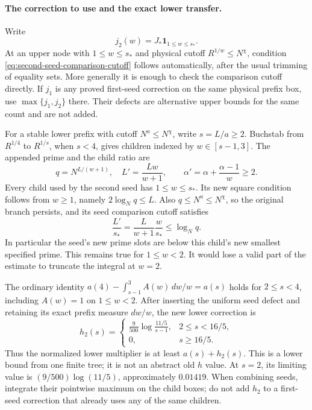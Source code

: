 \paragraph{The correction to use and the exact lower transfer.}
Write
\[
 j_2(w)=J_*\mathbf1_{1\le w\le s_*}.
\]
At an upper node with $1\le w\le s_*$ and physical cutoff
$R^{1/w}\le N^\chi$, condition
\eqref{eq:second-seed-comparison-cutoff} follows automatically,
after the usual trimming of equality sets.  More generally it is
enough to check the comparison cutoff directly.  If $j_1$ is any
proved first-seed correction on the same physical prefix box, use
$\max\{j_1,j_2\}$ there.  Their defects are alternative upper
bounds for the same count and are not added.

For a stable lower prefix with cutoff $N^a\le N^\chi$, write
$s=L/a\ge2$.  Buchstab from $R^{1/4}$ to $R^{1/s}$, when $s<4$,
gives children indexed by $w\in[s-1,3]$.  The appended prime and
the child ratio are
\[
 q=N^{L/(w+1)},\quad L'=\frac{Lw}{w+1},\qquad
 \alpha'=\alpha+\frac{\alpha-1}{w}\ge2.
\]
Every child used by the second seed has $1\le w\le s_*$.
Its new square condition follows from $w\ge1$, namely
$2\log_Nq\le L$.  Also $q\le N^a\le N^\chi$, so the original
branch persists, and its seed comparison cutoff satisfies
\begin{equation}\label{eq:second-seed-child-cutoff}
 \frac{L'}{s_*}=\frac{L}{w+1}\frac{w}{s_*}
 \le\log_Nq.
\end{equation}
In particular the seed's new prime slots are below this child's
new smallest specified prime.  This remains true for $1\le w<2$.
It would lose a valid part of the estimate to truncate the integral
at $w=2$.

The ordinary identity
$a(4)-\int_{s-1}^3 A(w)\,dw/w=a(s)$ holds for $2\le s<4$,
including $A(w)=1$ on $1\le w<2$.  After inserting the uniform seed
defect and retaining its exact prefix measure $dw/w$, the new lower
correction is
\begin{equation}\label{eq:second-seed-stable-lower}
 h_2(s)=
 \begin{cases}
 \displaystyle\frac9{500}\log\frac{11/5}{s-1},&2\le s<16/5,\\
 0,&s\ge16/5.
 \end{cases}
\end{equation}
Thus the normalized lower multiplier is at least $a(s)+h_2(s)$.
This is a lower bound from one finite tree; it is not an abstract
old $h$ value.  At $s=2$, its limiting value is
$(9/500)\log(11/5)$, approximately $0.01419$.
When combining seeds, integrate their pointwise maximum on the
child boxes; do not add $h_2$ to a first-seed correction that already
uses any of the same children.

